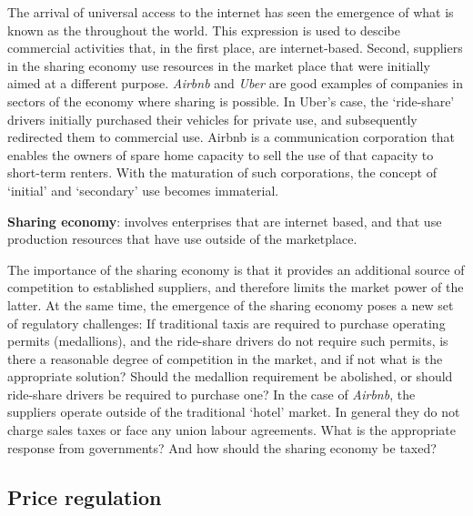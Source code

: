 The arrival of universal access to the internet has seen the emergence of
what is known as the  throughout the world. 
This expression is used to descibe commercial
activities that, in the first place, are internet-based. Second, suppliers
in the sharing economy use resources in the market place that were initially
aimed at a different purpose. \textit{Airbnb} and \textit{Uber} are good
examples of companies in sectors of the economy where sharing is possible.
In Uber's case, the `ride-share' drivers initially purchased their vehicles
for private use, and subsequently redirected them to commercial use. Airbnb
is a communication corporation that enables the owners of spare home
capacity to sell the use of that capacity to short-term renters. With the
maturation of such corporations, the concept of `initial' and `secondary'
use becomes immaterial. 

\begin{DefBox}
	\textbf{Sharing economy}: involves enterprises that are internet based, and that use production resources that have use outside of the marketplace. 
\end{DefBox}

The importance of the sharing economy is that it provides an additional
source of competition to established suppliers, and therefore limits the
market power of the latter. At the same time, the emergence of the sharing
economy poses a new set of regulatory challenges: If traditional taxis are
required to purchase operating permits (medallions), and the ride-share
drivers do not require such permits, is there a reasonable degree of
competition in the market, and if not what is the appropriate solution?
Should the medallion requirement be abolished, or should ride-share drivers
be required to purchase one? In the case of \textit{Airbnb}, the suppliers
operate outside of the traditional `hotel' market. In general they do not
charge sales taxes or face any union labour agreements. What is the
appropriate response from governments? And how should the sharing economy be
taxed?

\newhtmlpage

\subsection*{Price regulation}

